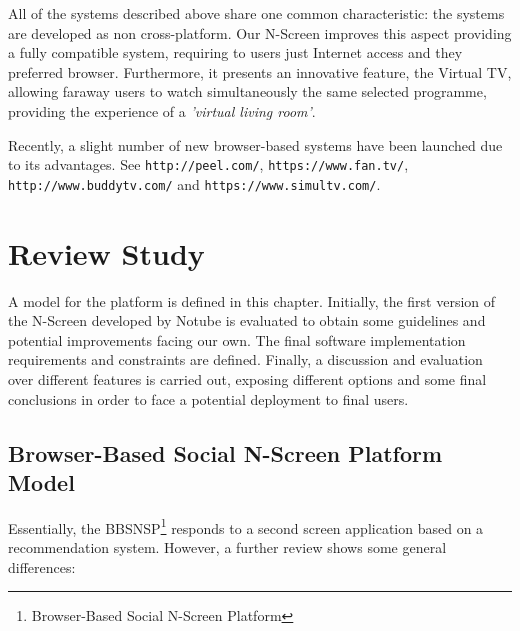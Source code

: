\documentclass{acm_proc_article-sp}
\begin{document}
All of the systems described above share one common characteristic: the systems are developed as non cross-platform. Our N-Screen improves this aspect providing a fully compatible system, requiring to users just Internet access and they preferred browser. Furthermore, it presents an innovative feature, the Virtual TV, allowing faraway users to watch simultaneously the same selected programme, providing the experience of a \textit{'virtual living room'}. 

Recently, a slight number of new browser-based systems have been launched due to its advantages. See \texttt{http://peel.com/}, \texttt{https://www.fan.tv/}, \texttt{http://www.buddytv.com/} and \newline \texttt{https://www.simultv.com/}. 
\section{Review Study}
A model for the platform is defined in this chapter. Initially, the first version of the N-Screen developed by Notube\cite{aroyo2009notube} is evaluated to obtain some guidelines and potential improvements facing our own. The final software implementation requirements and constraints are defined. Finally, a discussion and evaluation over different features is carried out, exposing different options and some final conclusions in order to face a potential deployment to final users.
\subsection{Browser-Based Social N-Screen Platform Model}

Essentially, the BBSNSP\footnote{Browser-Based Social N-Screen Platform} responds to a second screen application based on a recommendation system. However, a further review shows some general differences:
\end{document}

